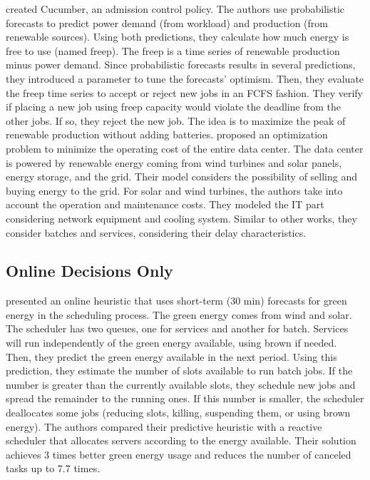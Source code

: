 \citeauthor{wiesner2022cucumber} \cite{wiesner2022cucumber} created Cucumber, an admission control policy. The authors use probabilistic forecasts to predict power demand (from workload) and production (from renewable sources). Using both predictions, they calculate how much energy is free to use (named freep). The freep is a time series of renewable production minus power demand. Since probabilistic forecasts results in several predictions, they introduced a parameter to tune the forecasts' optimism. Then, they evaluate the freep time series to accept or reject new jobs in an FCFS fashion. They verify if placing a new job using freep capacity would violate the deadline from the other jobs. If so, they reject the new job. The idea is to maximize the peak of renewable production without adding batteries. \citeauthor{yuan2022optimal} \cite{yuan2022optimal} proposed an optimization problem to minimize the operating cost of the entire data center. The data center is powered by renewable energy coming from wind turbines and solar panels, energy storage, and the grid. Their model considers the possibility of selling and buying energy to the grid. For solar and wind turbines, the authors take into account the operation and maintenance costs. They modeled the IT part considering network equipment and cooling system. Similar to other works, they consider batches and services, considering their delay characteristics. 

\subsection{Online Decisions Only}

\citeauthor{aksanli2011utilizing} \cite{aksanli2011utilizing} presented an online heuristic that uses short-term (30 min) forecasts for green energy in the scheduling process. The green energy comes from wind and solar. The scheduler has two queues, one for services and another for batch. Services will run independently of the green energy available, using brown if needed. Then, they predict the green energy available in the next period. Using this prediction, they estimate the number of slots available to run batch jobs. If the number is greater than the currently available slots, they schedule new jobs and spread the remainder to the running ones. If this number is smaller, the scheduler deallocates some jobs (reducing slots, killing, suspending them, or using brown energy). The authors compared their predictive heuristic with a reactive scheduler that allocates servers according to the energy available. Their solution achieves 3 times better green energy usage and reduces the number of canceled tasks up to 7.7 times.

